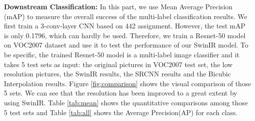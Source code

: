 \documentclass[10pt,twocolumn,letterpaper]{article}
\begin{document}
{\bf Downstream Classification:} In this part, we use Mean Average Precision (mAP) to measure the overall success of the multi-label classification results. We first train a 3-conv-layer CNN based on 442 assignment. However, the test mAP is only 0.1796, which can hardly be used. Therefore, we train a Resnet-50 model on VOC2007 dataset and use it to test the performance of our SwinIR model. To be specific, the trained Resnet-50 model is a multi-label image classifier and it takes 5 test sets as input: the original pictures in VOC2007 test set, the low resolution pictures, the SwinIR results, the SRCNN results and the Bicubic Interpolation results. Figure \ref{fig:comparison} shows the visual comparison of those 5 sets. We can see that the resolution has been improved to a great extent by using SwinIR. Table \ref{tab:mean} shows the quantitative comparisons among those 5 test sets and  Table \ref{tab:all} shows the Average Precision(AP) for each class. 
\par

\begin{table}[h!]
\centering
\begin{minipage}[htbp!]{0.5\textwidth}
\centering
{}
\end{minipage}
\caption{Mean Average Precision under Different Test Set}
\label{tab:mean}
\end{table}
\end{document}
